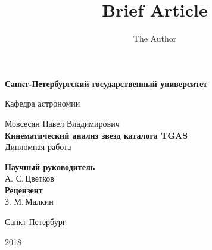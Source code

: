 \documentclass[14pt]{article} %
\title{Brief Article}
\author{The Author}
\begin{document}
\begin{titlepage}

\begin{center}
{\small \bf Санкт-Петербургский государственный университет

Кафедра астрономии}
\end{center}

\vspace{2cm}
\begin{center}
Мовсесян Павел Владимирович\\
  \large{\bf Кинематический анализ звезд каталога TGAS}\\
  Дипломная работа
\end{center}

\vspace{3cm}

\hspace{8cm}\parbox{8cm}{	%

\footnotesize{{\bf Научный руководитель}\\
А. С.\,Цветков} \\  %

{\bf Рецензент}\\
З. М.\,Малкин \\  %
}

\vfill %

\begin{center}
\small {Санкт-Петербург

2018}
\end{center}

\end{titlepage}
\end{document}
